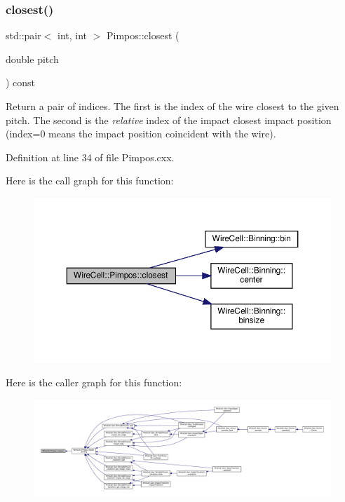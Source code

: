 \subsubsection{\texorpdfstring{closest()}{closest()}}
{\footnotesize\ttfamily std\+::pair$<$ int, int $>$ Pimpos\+::closest (\begin{DoxyParamCaption}\item[{double}]{pitch }\end{DoxyParamCaption}) const}

Return a pair of indices. The first is the index of the wire closest to the given pitch. The second is the {\itshape relative} index of the impact closest impact position (index=0 means the impact position coincident with the wire). 

Definition at line 34 of file Pimpos.\+cxx.

Here is the call graph for this function\+:
\nopagebreak
\begin{figure}[H]
\begin{center}
\leavevmode
\includegraphics[width=350pt]{class_wire_cell_1_1_pimpos_ae3a8be480718c7cf1ad0551947591fc3_cgraph}
\end{center}
\end{figure}
Here is the caller graph for this function\+:
\nopagebreak
\begin{figure}[H]
\begin{center}
\leavevmode
\includegraphics[width=350pt]{class_wire_cell_1_1_pimpos_ae3a8be480718c7cf1ad0551947591fc3_icgraph}
\end{center}
\end{figure}
\mbox{\label{class_wire_cell_1_1_pimpos_abeadf8b503815d0dbfaf5d94d245b5bd}} 
